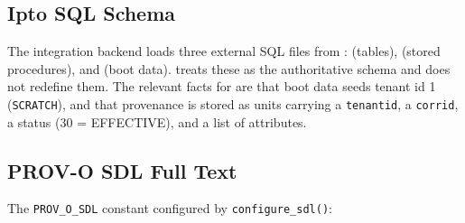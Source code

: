 \subsection{Ipto SQL Schema}

The integration backend loads three external SQL files from
:  (tables),
 (stored procedures), and  (boot
data). \vannak{} treats these as the authoritative \ipto{} schema and does not
redefine them. The relevant facts for \vannak{} are that boot data seeds tenant
id 1 (\texttt{SCRATCH}), and that provenance is stored as units carrying a
\texttt{tenantid}, a \texttt{corrid}, a status (30 = EFFECTIVE), and a list of
attributes.

\subsection{PROV-O SDL Full Text}

The \texttt{PROV\_O\_SDL} constant configured by \texttt{configure\_sdl()}:

